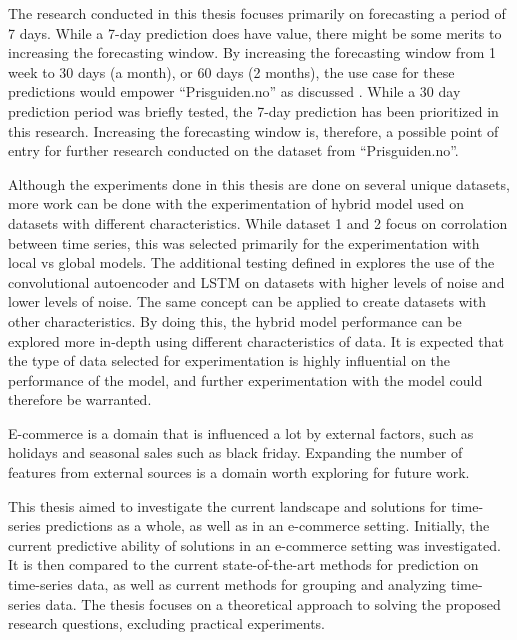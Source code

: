 The research conducted in this thesis focuses primarily on forecasting a period of 7 days.
While a 7-day prediction does have value,
there might be some merits to increasing the forecasting window.
By increasing the forecasting window from 1 week to 30 days (a month), or 60 days (2 months),
the use case for these predictions would empower ``Prisguiden.no'' as discussed .
While a 30 day prediction period was briefly tested,
the 7-day prediction has been prioritized in this research.
Increasing the forecasting window is, therefore, a possible point of entry for further research conducted on the
dataset from ``Prisguiden.no''.


Although the experiments done in this thesis are done on several unique datasets,
more work can be done with the experimentation of hybrid model used on datasets with different characteristics.
While dataset 1 and 2 focus on corrolation between time series, this was selected primarily for the experimentation with local vs global models.
The additional testing defined in  explores the use of the convolutional autoencoder and LSTM
on datasets with higher levels of noise and lower levels of noise.
The same concept can be applied to create datasets with other characteristics.
By doing this, the hybrid model performance can be explored more in-depth using different characteristics of data.
It is expected that the type of data selected for experimentation is highly influential on the performance of the model,
and further experimentation with the model could therefore be warranted.

E-commerce is a domain that is influenced a lot by external factors, such as holidays and seasonal sales such as black friday.
Expanding the number of features from external sources is a domain worth exploring for future work.



\iffalse
  This thesis aimed to investigate the current landscape and solutions for time-series predictions as a whole,
  as well as in an e-commerce setting.
  Initially, the current predictive ability of solutions in an e-commerce setting was investigated.
  It is then compared to the current state-of-the-art methods for prediction on time-series data,
  as well as current methods for grouping and analyzing time-series data.
  The thesis focuses on a theoretical approach to solving the proposed research questions,
  excluding practical experiments.

